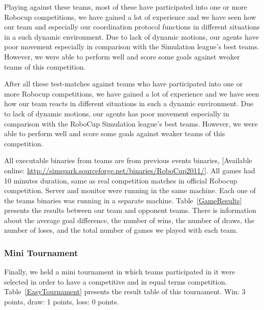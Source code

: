 Playing against these teams, most of these have participated into one or more Robocup competitions, we have gained a lot of experience and we have seen how our team and especially our coordination protocol functions in different situations in a such dynamic environment. Due to lack of dynamic motions, our agents have poor movement especially in comparison with the Simulation league's best teams. However, we were able to perform well and score some goals against weaker teams of this competition.

After all these test-matches against teams who have participated into one or more Robocup competitions, we have gained a lot of experience and we have seen how our team reacts in different situations in such a dynamic environment. Due to lack of dynamic motions, our agents has poor movement especially in comparison with the RoboCup Simulation league's best teams. However, we were able to perform well and score some goals against weaker teams of this competition.

All executable binaries from teams are from previous events binaries, [Available online: \url{http://simspark.sourceforge.net/binaries/RoboCup2011/}]. All games had 10 minutes duration, same as real competition matches in official Robocup competition. Server and monitor were running in the same machine\footnotemark. Each one of the teams binaries was running in a separate machine\footnotemark . Table~\ref{GameResults} presents the results between our team and opponent teams. There is information about the average goal difference, the number of wins, the number of draws, the number of loses, and the total number of games we played with each team.
\clearpage


\subsubsection*{Mini Tournament}

Finally, we held a mini tournament in which teams participated in it were selected in order to have a competitive and in equal terms competition. Table~\ref{EasyTournament} presents the result table of this tournament. Win: 3 points, draw: 1 points, loss: 0 points.

